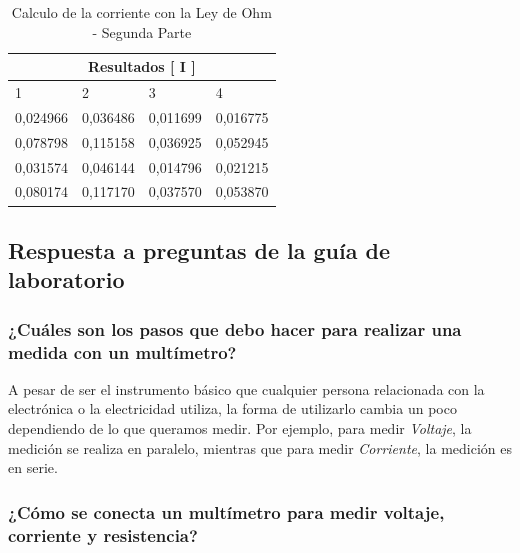 \documentclass[letterpaper, 12pt]{report}
\begin{document}
\begin{table}[H]
	\begin{center}
		\begin{tabular}{| p{2cm} | p{2cm} | p{2cm} | p{2cm} |}
			\hline
			\multicolumn{4}{c}{Resultados [ I ]}      \\ \hline


			1        & 2        & 3        & 4        \\ \hline

			0,024966 & 0,036486 & 0,011699 & 0,016775 \\ \hline

			0,078798 & 0,115158 & 0,036925 & 0,052945 \\ \hline

			0,031574 & 0,046144 & 0,014796 & 0,021215 \\ \hline

			0,080174 & 0,117170 & 0,037570 & 0,053870 \\ \hline
		\end{tabular}
		\caption{Calculo de la corriente con la Ley de Ohm - Segunda Parte}
		\label{tab:LeyDeOhmSegundaParte}
	\end{center}
\end{table}

\subsection{Respuesta a preguntas de la guía de laboratorio}

\subsubsection{¿Cuáles son los pasos que debo hacer para realizar una medida
	con un multímetro?}

A pesar de ser el instrumento básico que cualquier persona relacionada con
la electrónica o la electricidad utiliza, la forma de utilizarlo cambia un poco
dependiendo de lo que queramos medir. Por ejemplo, para medir \textit{Voltaje},
la medición se realiza en paralelo, mientras que para medir \textit{Corriente},
la medición es en serie.

\subsubsection{¿Cómo se conecta un multímetro para medir voltaje, corriente
	y resistencia?}
\end{document}
